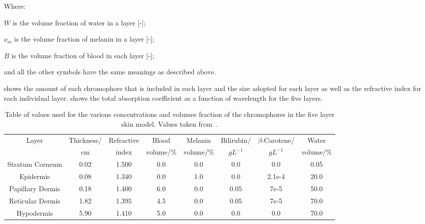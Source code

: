 \noindent Where:

\indent $W$ is the volume fraction of water in a layer [-];

\indent $\nu_m$ is the volume fraction of melanin in a layer [-];

\indent $B$ is the volume fraction of blood in each layer [-];

\indent and all the other symbols have the same meanings as described above.

\medskip

 shows the amount of each chromophore that is included in each layer and the size adopted for each layer as well as the refractive index for each individual layer.
 shows the total absorption coefficient as a function of wavelength for the five layers.


\begin{table}[!tbhp] 
    \begin{adjustwidth}{-.5in}{-.5in}  

  \begin{center}
  \begin{tabular}{|c|c|c|c|c|c|c|c|}
  \hline
  Layer & Thickness/ & Refractive & Blood & Melanin & Bilirubin/ & $\beta$-Carotene/ & Water\\
    &cm & index & volume/\% & volume/\% & $gL^{-1}$ & $gL^{-1}$ & volume/\%\\
  \hline
  Stratum Corneum  & 0.02 & 1.500  & 0.0 & 0.0 & 0.0  & 0.0 & 0.05\\
  Epidermis        & 0.08 & 1.340  & 0.0 & 1.0 & 0.0  & 2.1e-4 & 20.0\\
  Papillary Dermis & 0.18 & 1.400  & 6.0 & 0.0 & 0.05 & 7e-5 & 50.0\\
  Reticular Dermis & 1.82 & 1.395  & 4.5 & 0.0 & 0.05 & 7e-5 & 70.0\\
  Hypodermis       & 5.90 & 1.410  & 5.0 & 0.0 & 0.0  & 0.0 & 70.0\\

  \hline
  \end{tabular}
    \caption{Table of values used for the various concentrations and volumes fraction of the chromophores in the five layer skin model. Values taken from~\cite{krishnaswamy2004biophysically,meglinski2002quantitative,campbell20153d,iglesias2015biophysically}.}
  \label{tab:optpropsvals}
  \end{center}
      \end{adjustwidth}

\end{table}


